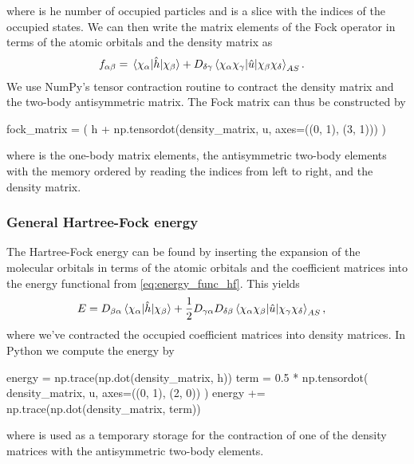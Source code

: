             where  is he number of occupied particles and  is a
            slice with the indices of the occupied states.
            We can then write the matrix elements of the Fock operator in terms
            of the atomic orbitals and the density matrix as
            \begin{align}
                f_{\alpha\beta}
                &= \mel*{\chi_{\alpha}}{\hat{h}}{\chi_{\beta}}
                +
                D_{\delta\gamma}
                \mel*{\chi_{\alpha}\chi_{\gamma}}{
                    \hat{u}
                }{\chi_{\beta}\chi_{\delta}}_{AS}.
                \label{eq:ghf-fock-matrix}
            \end{align}
            We use NumPy's tensor contraction routine  to
            contract the density matrix and the two-body antisymmetric matrix.
            The Fock matrix can thus be constructed by
            \begin{python}
fock_matrix = (
    h + np.tensordot(density_matrix, u, axes=((0, 1), (3, 1)))
)
            \end{python}
            where  is the one-body matrix elements,  the
            antisymmetric two-body elements with the memory ordered by reading
            the indices from left to right, and  the
            density matrix.

            \subsubsection{General Hartree-Fock energy}
                The Hartree-Fock energy can be found by inserting the expansion
                of the molecular orbitals in terms of the atomic orbitals and
                the coefficient matrices into the energy functional from
                \autoref{eq:energy_func_hf}.
                This yields
                \begin{align}
                    E
                    &=
                    D_{\beta\alpha}
                    \mel*{\chi_{\alpha}}{\hat{h}}{\chi_{\beta}}
                    + \frac{1}{2}
                    D_{\gamma\alpha} D_{\delta\beta}
                    \mel*{\chi_{\alpha}\chi_{\beta}}{
                        \hat{u}
                    }{\chi_{\gamma}\chi_{\delta}}_{AS},
                    \label{eq:general-hartree-fock-energy}
                \end{align}
                where we've contracted the occupied coefficient matrices into
                density matrices.
                In Python we compute the energy by
                \begin{python}
energy = np.trace(np.dot(density_matrix, h))
term = 0.5 * np.tensordot(
    density_matrix, u, axes=((0, 1), (2, 0))
)
energy += np.trace(np.dot(density_matrix, term))
                \end{python}
                where  is used as a temporary storage for the
                contraction of one of the density matrices with the
                antisymmetric two-body elements.


